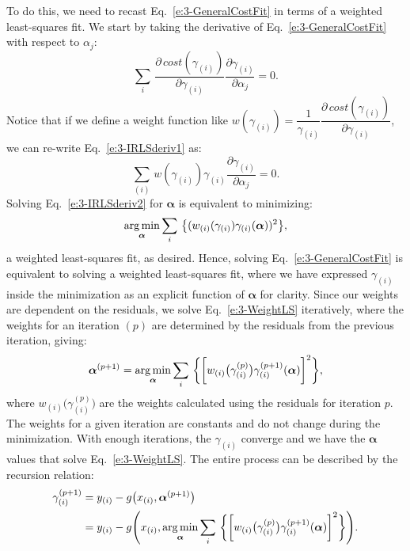 To do this, we need to recast Eq.~\ref{e:3-GeneralCostFit} in terms of a weighted least-squares fit.
We start by taking the derivative of Eq.~\ref{e:3-GeneralCostFit} with respect to $\alpha_j$:
\begin{equation}
  \sum\limits_i\,\frac{\partial \, \mathit{cost}(\gamma_{(i)})}{\partial \gamma_{(i)}} \frac{\partial \gamma_{(i)}}{\partial \alpha_j} = 0.\label{e:3-IRLSderiv1}
\end{equation}
Notice that if we define a weight function like $w(\gamma_{(i)}) = \dfrac{1}{\gamma_{(i)}}\dfrac{\partial \, \mathit{cost}(\gamma_{(i)})}{\partial \gamma_{(i)}}$, we can re-write Eq.~\ref{e:3-IRLSderiv1} as:
\begin{equation}
  \sum\limits_{(i)}\,w(\gamma_{(i)}) \gamma_{(i)} \frac{\partial \gamma_{(i)}}{\partial \alpha_j} = 0.\label{e:3-IRLSderiv2}
\end{equation}
 Solving Eq.~\ref{e:3-IRLSderiv2} for $\bm{\alpha}$ is equivalent to minimizing:
 \begin{equation}
   \operatorname*{arg\,min}_{\bm{\alpha}} \sum\limits_i\,\big \{ (w_{(i)}(\gamma_{(i)}) \gamma_{(i)}(\bm{\alpha}))^2 \big \},\label{e:3-WeightLS}
 \end{equation}
 a weighted least-squares fit, as desired.
Hence, solving Eq.~\ref{e:3-GeneralCostFit} is equivalent to solving a weighted least-squares fit, where we have expressed $\gamma_{(i)}$ inside the minimization as an explicit function of $\bm{\alpha}$ for clarity.
Since our weights are dependent on the residuals, we solve Eq.~\ref{e:3-WeightLS} iteratively, where the weights for an iteration $(p)$ are determined by the residuals from the previous iteration, giving:
\begin{equation}
  \bm{\alpha}^{(p+1)} = \operatorname*{arg\,min}_{\bm{\alpha}} \sum\limits_i\,\bigg \{ \bigg [w_{(i)} \big(\gamma_{(i)}^{(p)}\big ) \gamma^{(p+1)}_{(i)}(\bm{\alpha}) \bigg ]^2 \bigg \},
\end{equation}
where $w_{(i)} \big(\gamma_{(i)}^{(p)}\big )$ are the weights calculated using the residuals for iteration $p$.
The weights for a given iteration are constants and do not change during the minimization.
With enough iterations, the $\gamma_{(i)}$ converge and we have the $\bm{\alpha}$ values that solve Eq.~\ref{e:3-WeightLS}.
The entire process can be described by the recursion relation:
\begin{align}
  \gamma_{(i)}^{(p+1)}
  &= y_{(i)} - g\big (x_{(i)},\bm{\alpha}^{(p+1)}\big ) \nonumber \\
  &= y_{(i)} - g\Bigg (x_{(i)}, \operatorname*{arg\,min}_{\bm{\alpha}} \sum\limits_i\,\bigg \{ \bigg [w_{(i)} \big(\gamma_{(i)}^{(p)}\big ) \gamma^{(p+1)}_{(i)}(\bm{\alpha}) \bigg ]^2 \bigg \} \Bigg).
\end{align}

